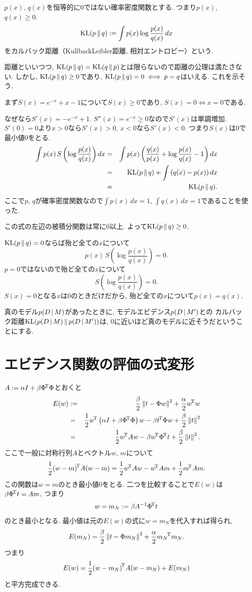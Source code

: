$p(x)$, $q(x)$を恒等的に$0$ではない確率密度関数とする. つまり$p(x)$, $q(x) \ge 0$.
$$
\mathop{\mathrm{KL}}\nolimits(p\,\|\,q):=\int p(x) \log \frac{p(x)}{q(x)}\,dx
$$
をカルバック距離（Kullback\－Leibler距離, 相対エントロピー）という.

距離といいつつ, $\mathop{\mathrm{KL}}\nolimits(p\,\|\,q)=\mathop{\mathrm{KL}}\nolimits(q\,\|\,p)$とは限らないので距離の公理は満たさない.
しかし, $\mathop{\mathrm{KL}}\nolimits(p\,\|\,q) \ge 0$であり, $\mathop{\mathrm{KL}}\nolimits(p\,\|\,q)=0 \iff p = q$はいえる.
これを示そう.

まず$S(x)=e^{-x}+x-1$について$S(x) \ge 0$であり, $S(x)=0 \iff x = 0$である.

なぜなら$S'(x)=-e^{-x}+1$. $S''(x)=e^{-x} \ge 0$なので$S'(x)$は単調増加. $S'(0) = 0$より$x > 0$なら$S'(x) > 0$, $x<0$なら$S'(x)<0$. つまり$S(x)$は$0$で最小値$0$をとる.
\begin{eqnarray*}
\int p(x)\, S\left(\log \frac{p(x)}{q(x)}\right) dx
 &=& \int p(x) \left(\frac{q(x)}{p(x)} + \log \frac{p(x)}{q(x)} - 1\right) dx\\
 &=& \mathop{\mathrm{KL}}\nolimits(p\,\|\,q) + \int \left(q(x) - p(x)\right) dx\\
 &=& \mathop{\mathrm{KL}}\nolimits(p\,\|\,q).
\end{eqnarray*}
ここで$p$, $q$が確率密度関数なので$\int p(x)\,dx = 1$, $\int q(x)\,dx=1$であることを使った.

この式の左辺の被積分関数は常に$0$以上. よって$\mathop{\mathrm{KL}}\nolimits(p\,\|\,q) \ge 0$.

$\mathop{\mathrm{KL}}\nolimits(p\,\|\,q) = 0$ならば殆ど全ての$x$について
$$
p(x)\, S\left(\log \frac{p(x)}{q(x)}\right)=0.
$$
$p=0$ではないので殆ど全ての$x$について
$$S\left(\log \frac{p(x)}{q(x)}\right)=0.$$
$S(x)=0$となる$x$は$0$のときだけだから,
殆ど全ての$x$について$p(x)=q(x)$.

真のモデル$\fnvPair p(D|M)$があったときに,
モデルエビデンス$\fnvPair p(D|M')$との
カルバック距離$\mathop{\mathrm{KL}}\nolimits(p(D\,|\,M)\,\|\,p(D\,|\,M'))$は,
0に近いほど真のモデルに近そうだということにする.

\section{エビデンス関数の評価の式変形}
$A:=\alpha I + \beta {\Phi}^{\!\mathrm{T}}\Phi$とおくと
\begin{eqnarray*}
E(w) &:=& \frac{\beta}{2}\Norm{t-\Phi w}^2+\frac{\alpha}{2}\trans{w}w\\
&=& \half\trans{w}\left(\alpha I + \beta \trans{\Phi}\Phi\right)w
    -\beta \trans{t}\Phi w+\frac{\beta}{2}\Norm{t}^2\\
&=& \half\trans{w}Aw
    -\beta \trans{w}\trans{\Phi} t +\frac{\beta}{2}\Norm{t}^2.
\end{eqnarray*}
ここで一般に対称行列$A$とベクトル$w$, $m$について
$$
\frac{1}{2}{(w-m)}^{\!\mathrm{T}}A(w-m)=\frac{1}{2}{w}^{\!\mathrm{T}}Aw-{w}^{\!\mathrm{T}}Am+\frac{1}{2}{m}^{\!\mathrm{T}}Am.
$$
この関数は$w=m$のとき最小値$0$をとる.
二つを比較することで$E(w)$は$\beta{\Phi}^{\!\mathrm{T}}t=Am$, つまり
$$
w=m_N:=\beta A^{-1}{\Phi}^{\!\mathrm{T}}t
$$
のとき最小となる. 最小値は元の$E(w)$の式に$w=m_N$を代入すれば得られ,
$$
E(m_N)=\frac{\beta}{2}\Norm{t-\Phi m_N}^2+\frac{\alpha}{2}\trans{m_N} m_N.
$$
つまり
$$
E(w)=\frac{1}{2}{(w-m_N)}^{\!\mathrm{T}}A{(w-m_N)} + E(m_N)
$$
と平方完成できる.


